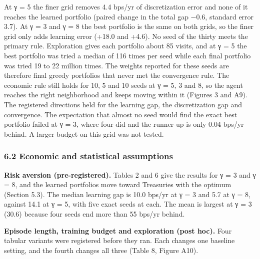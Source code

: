 \documentclass[
  11pt]{article}
\newcounter{none} %
\begin{document}
At γ = 5 the finer grid removes 4.4 bps/yr of discretization error and
none of it reaches the learned portfolio (paired change in the total gap
−0.6, standard error 3.7). At γ = 3 and γ = 8 the best portfolio is the
same on both grids, so the finer grid only adds learning error (+18.0
and +4.6). No seed of the thirty meets the primary rule. Exploration
gives each portfolio about 85 visits, and at γ = 5 the best portfolio
was tried a median of 116 times per seed while each final portfolio was
tried 19 to 22 million times. The weights reported for these seeds are
therefore final greedy portfolios that never met the convergence rule.
The economic rule still holds for 10, 5 and 10 seeds at γ = 5, 3 and 8,
so the agent reaches the right neighborhood and keeps moving within it
(Figures 3 and A9). The registered directions held for the learning gap,
the discretization gap and convergence. The expectation that almost no
seed would find the exact best portfolio failed at γ = 3, where four did
and the runner-up is only 0.04 bps/yr behind. A larger budget on this
grid was not tested.

\subsubsection{6.2 Economic and statistical
assumptions}\label{economic-and-statistical-assumptions}

\textbf{Risk aversion (pre-registered).} Tables 2 and 6 give the results
for γ = 3 and γ = 8, and the learned portfolios move toward Treasuries
with the optimum (Section 5.3). The median learning gap is 10.0 bps/yr
at γ = 3 and 5.7 at γ = 8, against 14.1 at γ = 5, with five exact seeds
at each. The mean is largest at γ = 3 (30.6) because four seeds end more
than 55 bps/yr behind.

\textbf{Episode length, training budget and exploration (post hoc).}
Four tabular variants were registered before they ran. Each changes one
baseline setting, and the fourth changes all three (Table 8, Figure
A10).
\end{document}
